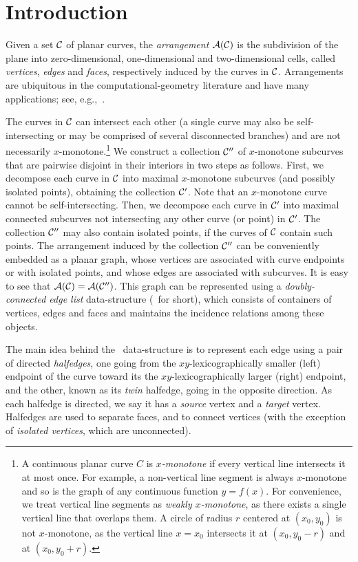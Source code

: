 \section{Introduction\label{arr_sec:intro}}

Given a set ${\cal C}$ of planar curves, the {\em arrangement}
${\cal A}({\cal C})$ is the subdivision of the plane into zero-dimensional,
one-dimensional and two-dimensional cells, called {\em vertices}, {\em
edges} and {\em faces}, respectively induced by the curves in ${\cal C}$.
Arrangements are ubiquitous in the computational-geometry
literature and have many applications;
see, e.g.,~\cite{as-aa-00,cgal:h-a-04}.

The curves in ${\cal C}$ can intersect each other (a single curve may also
be self-intersecting or may be comprised of several disconnected branches)
and are not necessarily $x$-monotone.\footnote{A continuous planar curve $C$
is {\em $x$-monotone} if every vertical line intersects it at
most once. For example, a non-vertical line segment is always
$x$-monotone and so is the graph of any continuous function $y = f(x)$.
For convenience, we treat vertical line segments as {\em weakly
$x$-monotone}, as there exists a single vertical line that overlaps them.
A circle of radius $r$ centered at $(x_0, y_0)$ is not $x$-monotone, as
the vertical line $x = x_0$ intersects it at $(x_0, y_0 - r)$ and at
$(x_0, y_0 + r)$.}
We construct a collection ${\cal C}''$ of
$x$-monotone subcurves that are pairwise disjoint in their interiors
in two steps as follows. First, we decompose each curve in ${\cal C}$
into maximal $x$-monotone subcurves (and possibly isolated points),
obtaining the collection ${\cal C}'$. Note that an $x$-monotone curve cannot
be self-intersecting. Then, we decompose each curve in ${\cal C}'$ into
maximal connected subcurves not intersecting any other
curve (or point) in ${\cal C}'$. The collection ${\cal C}''$ may also
contain isolated points, if the curves of ${\cal C}$ contain such
points. The arrangement induced by the collection ${\cal C}''$ can be
conveniently embedded as a planar graph, whose vertices are associated
with curve endpoints or with isolated points, and whose edges are
associated with subcurves. It is easy to see that
${\cal A}({\cal C}) = {\cal A}({\cal C}'')$. This graph can be represented using a
{\em doubly-connected edge list} data-structure (\dcel\ for short),
which consists of containers of vertices, edges and faces and
maintains the incidence relations among these objects.

The main idea behind the \dcel\ data-structure is to represent
each edge using a pair of directed {\em halfedges}, one going from
the $xy$-lexicographically smaller (left) endpoint of the curve toward
its the $xy$-lexicographically larger (right) endpoint, and the other,
known as its {\em twin} halfedge, going in the opposite direction. As each
halfedge is directed, we say it has a {\em source} vertex and a {\em target}
vertex. Halfedges are used to separate faces, and to
connect vertices (with the exception of {\em isolated vertices}, which
are unconnected).


